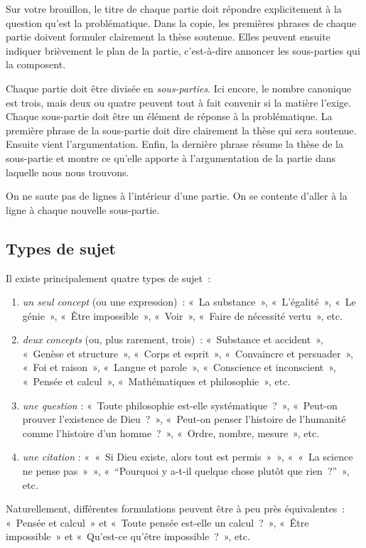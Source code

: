 \documentclass[a4paper]{article}
\begin{document}
Sur votre brouillon, le titre de chaque partie doit répondre
explicitement à la question qu'est la problématique. Dans la copie, les
premières phrases de chaque partie doivent formuler clairement la thèse
soutenue. Elles peuvent ensuite indiquer brièvement le plan de la
partie, c'est-à-dire annoncer les sous-parties qui la composent.

Chaque partie doit être divisée en \emph{sous-parties}. Ici encore, le nombre
canonique est trois, mais deux ou quatre peuvent tout à fait convenir si
la matière l'exige. Chaque sous-partie doit être un élément de réponse à
la problématique. La première phrase de la sous-partie doit dire
clairement la thèse qui sera soutenue. Ensuite vient l'argumentation.
Enfin, la dernière phrase résume la thèse de la sous-partie et montre ce
qu'elle apporte à l'argumentation de la partie dans laquelle nous nous
trouvons.

On ne saute pas de lignes à l'intérieur d'une partie. On se contente
d'aller à la ligne à chaque nouvelle sous-partie.
\subsection{Types de sujet}
\label{sec-3-1}


Il existe principalement quatre types de sujet :

\begin{enumerate}
\item \emph{un seul concept} (ou une expression) : « La substance », « L'égalité »,
   « Le génie », « Être impossible », « Voir », « Faire de nécessité vertu »,
   etc.
\item \emph{deux concepts} (ou, plus rarement, trois) : « Substance et accident »,
   « Genèse et structure », « Corps et esprit », « Convaincre et persuader »,
   « Foi et raison », « Langue et parole », « Conscience et inconscient »,
   « Pensée et calcul », « Mathématiques et philosophie », etc.
\item \emph{une question} : « Toute philosophie est-elle systématique ? »,
   « Peut-on prouver l'existence de Dieu ? », « Peut-on penser l'histoire
   de l'humanité comme l'histoire d'un homme ? », « Ordre, nombre,
   mesure », etc.
\item \emph{une citation} : « « Si Dieu existe, alors tout est permis » »,
   « « La science ne pense pas » », « ``Pourquoi y a-t-il quelque chose
   plutôt que rien ?'' », etc.
\end{enumerate}

Naturellement, différentes formulations peuvent être à peu près
équivalentes : « Pensée et calcul » et « Toute pensée est-elle un
calcul ? », « Être impossible » et « Qu'est-ce qu'être impossible ? », etc.
\end{document}
